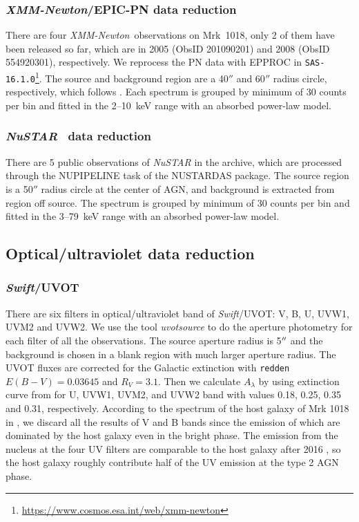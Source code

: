 \documentclass[twocolumn]{aastex63}
\newcommand{\xmm}{{\em XMM-Newton}}
\newcommand{\nustar}{{\em NuSTAR }}
\newcommand{\uvot}{{\small {\it Swift}/UVOT}}
\begin{document}
\subsubsection{\xmm/EPIC-PN data reduction}
There are four \xmm \, observations on Mrk~1018, only 2 of them have been released so far, which are in 2005 (ObsID 201090201) and 2008 (ObsID 554920301), respectively. We reprocess the PN data with {\scriptsize EPPROC} in \texttt{SAS-16.1.0}\footnote{\url{https://www.cosmos.esa.int/web/xmm-newton}}. The source and background region are a 40$''$ and 60$''$ radius circle, respectively, which follows \citet{2018MNRAS.480.3898N}. Each spectrum is grouped by minimum of 30 counts per bin and fitted in the 2--10~keV range with an absorbed power-law model. 



\subsubsection{\nustar\, data reduction}
There are 5 public observations of \nustar in the archive, which are processed through the {\scriptsize NUPIPELINE} task of the {\scriptsize NUSTARDAS} package. The source region is a 50$''$ radius circle at the center of AGN, and background is extracted from region off source. The spectrum is grouped by minimum of 30 counts per bin and fitted in the 3--79~keV range with an absorbed power-law model.


\subsection{Optical/ultraviolet data reduction}
\subsubsection{\uvot}
\label{sec:uvot}
There are six filters in optical/ultraviolet band of \uvot: V, B, U, UVW1, UVM2 and UVW2. We use the tool \textit{uvotsource} to do the aperture photometry for each filter of all the observations. The source aperture radius is 5$\mbox{$^{\prime\prime}$}$ and the background is chosen in a blank region with much larger aperture radius. The UVOT fluxes are corrected for the Galactic extinction with \texttt{redden} $E(B-V) = 0.03645$ \citep[see ][]{2018MNRAS.480.3898N} and $R_{V}=3.1$. Then we calculate  $A_{\lambda}$ by using extinction curve from \citet{2007ApJ...663..320F} for U, UVW1, UVM2, and 
UVW2 band with values 0.18, 0.25, 0.35 and 0.31, respectively. According to the spectrum of the host galaxy of Mrk 1018 in \citep{2018MNRAS.480.3898N}, we discard all the results of V and B bands since the emission of which are dominated by the host galaxy even in the bright phase. The emission from the nucleus at the four UV filters are comparable to the host galaxy after 2016 \citep[see][]{2018MNRAS.480.3898N}, so the host galaxy roughly contribute half of the UV emission at the type 2 AGN phase. 
\end{document}

